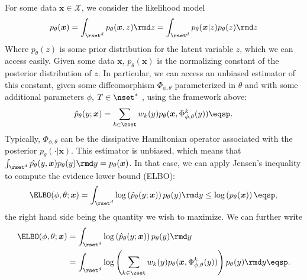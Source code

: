 For some data $\boldsymbol{x} \in \mathcal{X}$, we consider the likelihood model 
$$p_\theta(\boldsymbol{x}) = \int_{\rset^d} p_\theta(\boldsymbol{x},z) \rmd z = \int_{\rset^d} p_\theta(\boldsymbol{x}|z)p_\theta(z) \rmd z$$
Where $p_\theta(z)$ is some prior distribution for the latent variable $z$, which we can access easily.
Given some data $\boldsymbol{x}$, $p_\theta(\boldsymbol{x})$ is the normalizing constant of the posterior distribution of $z$. In particular, we can access an unbiased estimator of this constant, given some diffeomorphism $\Phi_{\phi, \theta}$ parameterized in $\theta$ and with some additional parameters $\phi$, $T \in \nset^* $ , using the framework above:
$$\hat{p}_\theta(y;\boldsymbol{x}) = \sum_{k\in \zset} w_k(y) p_\theta (\boldsymbol{x},\Phi_{\phi, \theta}^k(y)) \eqsp.$$
Typically, $\Phi_{\phi, \theta}$ can be the dissipative Hamiltonian operator associated with the posterior $p_\theta(\cdot|\boldsymbol{x})$. This estimator is unbiased, which means that $\int_{\rset^d} \hat{p_\theta}(y,\boldsymbol{x}) p_\theta(y) \rmd y = p_\theta(\boldsymbol{x}) $.
In that case, we can apply Jensen's inequality to compute the evidence lower bound (ELBO):
\begin{align*}
    \ELBO(\phi, \theta;\boldsymbol{x}) = \int_{\rset^d} \log\left(\hat{p}_\theta(y;\boldsymbol{x})\right) p_\theta(y) \rmd y \leq \log\left({p}_\theta(\boldsymbol{x})\right) \eqsp,
\end{align*}
the right hand side being the quantity we wish to maximize. 
We can further write
\begin{align*}
    \ELBO(\phi, \theta;\boldsymbol{x})& = \int_{\rset^d} \log\left(\hat{p}_\theta(y;\boldsymbol{x})\right) p_\theta(y) \rmd y \\
    &= \int_{\rset^d} \log\left(\sum_{k\in \zset} w_k(y) p_\theta (\boldsymbol{x},\Phi_{\phi, \theta}^k(y))\right) p_\theta(y) \rmd y \eqsp.
\end{align*}
